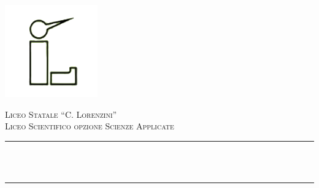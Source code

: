 \begin{titlepage}

\newcommand{\HRule}{\rule{\linewidth}{0.5mm}} %



\center \includegraphics[width = 4cm]{./figures/lorenzlogo}\\[0.1cm] 

\center %


\textsc{\Large Liceo Statale ``C. Lorenzini''}\\[0.5cm] 
\textsc{\large Liceo Scientifico opzione Scienze Applicate}\\[0.5cm] 


\HRule \\[0.4cm]
{ \huge \bfseries \reporttitle}\\ %
\HRule \\[1.5cm]
 

\begin{minipage}{0.4\textwidth}
\center \emph{}\\
\reportauthor
\end{minipage}
~



\end{titlepage}
